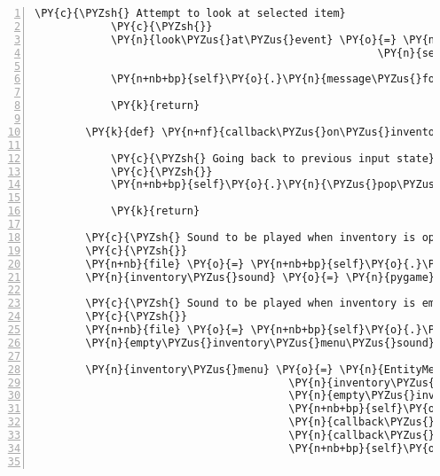\begin{Verbatim}[commandchars=\\\{\},numbers=left,firstnumber=1,stepnumber=1]
            \PY{c}{\PYZsh{} Attempt to look at selected item}
            \PY{c}{\PYZsh{}}
            \PY{n}{look\PYZus{}at\PYZus{}event} \PY{o}{=} \PY{n}{fabula}\PY{o}{.}\PY{n}{TriesToLookAtEvent}\PY{p}{(}\PY{n+nb+bp}{self}\PY{o}{.}\PY{n}{host}\PY{o}{.}\PY{n}{client\PYZus{}id}\PY{p}{,}
                                                      \PY{n}{selected\PYZus{}item}\PY{p}{)}

            \PY{n+nb+bp}{self}\PY{o}{.}\PY{n}{message\PYZus{}for\PYZus{}host}\PY{o}{.}\PY{n}{event\PYZus{}list}\PY{o}{.}\PY{n}{append}\PY{p}{(}\PY{n}{look\PYZus{}at\PYZus{}event}\PY{p}{)}

            \PY{k}{return}

        \PY{k}{def} \PY{n+nf}{callback\PYZus{}on\PYZus{}inventory\PYZus{}menu\PYZus{}exit}\PY{p}{(}\PY{n}{inventory\PYZus{}menu}\PY{p}{)}\PY{p}{:}

            \PY{c}{\PYZsh{} Going back to previous input state}
            \PY{c}{\PYZsh{}}
            \PY{n+nb+bp}{self}\PY{o}{.}\PY{n}{\PYZus{}pop\PYZus{}input\PYZus{}state\PYZus{}from\PYZus{}stack}\PY{p}{(}\PY{p}{)}

            \PY{k}{return}

        \PY{c}{\PYZsh{} Sound to be played when inventory is opened}
        \PY{c}{\PYZsh{}}
        \PY{n+nb}{file} \PY{o}{=} \PY{n+nb+bp}{self}\PY{o}{.}\PY{n}{assets}\PY{o}{.}\PY{n}{fetch}\PY{p}{(}\PY{l+s}{\PYZsq{}}\PY{l+s}{inventory.ogg}\PY{l+s}{\PYZsq{}}\PY{p}{)}
        \PY{n}{inventory\PYZus{}sound} \PY{o}{=} \PY{n}{pygame}\PY{o}{.}\PY{n}{mixer}\PY{o}{.}\PY{n}{Sound}\PY{p}{(}\PY{n+nb}{file}\PY{p}{)}

        \PY{c}{\PYZsh{} Sound to be played when inventory is empty}
        \PY{c}{\PYZsh{}}
        \PY{n+nb}{file} \PY{o}{=} \PY{n+nb+bp}{self}\PY{o}{.}\PY{n}{assets}\PY{o}{.}\PY{n}{fetch}\PY{p}{(}\PY{l+s}{\PYZsq{}}\PY{l+s}{empty\PYZus{}inventory\PYZus{}menu.ogg}\PY{l+s}{\PYZsq{}}\PY{p}{)}
        \PY{n}{empty\PYZus{}inventory\PYZus{}menu\PYZus{}sound} \PY{o}{=} \PY{n}{pygame}\PY{o}{.}\PY{n}{mixer}\PY{o}{.}\PY{n}{Sound}\PY{p}{(}\PY{n+nb}{file}\PY{p}{)}

        \PY{n}{inventory\PYZus{}menu} \PY{o}{=} \PY{n}{EntityMenuList}\PY{p}{(}\PY{p}{[}\PY{p}{]}\PY{p}{,}
                                        \PY{n}{inventory\PYZus{}sound}\PY{p}{,}
                                        \PY{n}{empty\PYZus{}inventory\PYZus{}menu\PYZus{}sound}\PY{p}{,}
                                        \PY{n+nb+bp}{self}\PY{o}{.}\PY{n}{channel\PYZus{}system}\PY{p}{,}
                                        \PY{n}{callback\PYZus{}on\PYZus{}inventory\PYZus{}item\PYZus{}selected}\PY{p}{,}
                                        \PY{n}{callback\PYZus{}on\PYZus{}inventory\PYZus{}menu\PYZus{}exit}\PY{p}{,}
                                        \PY{n+nb+bp}{self}\PY{o}{.}\PY{n}{tts\PYZus{}engine}\PY{p}{)}


\end{Verbatim}
